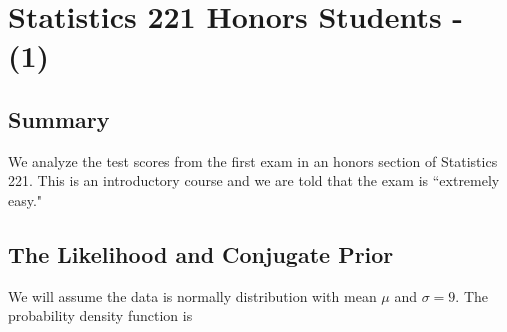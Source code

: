 \documentclass[12pt]{article}
\begin{document}
%
%
%

\newpage

\section{Statistics 221 Honors Students - (1)}

\subsection{Summary}

\noindent We analyze the test scores from the first exam in an honors section of Statistics 221.  This is an introductory course and we are told that the exam is ``extremely easy."

\subsection{The Likelihood and Conjugate Prior}

\noindent We will assume the data is normally distribution with mean $\mu$ and $\sigma=9$.  The probability density function is
\end{document}
